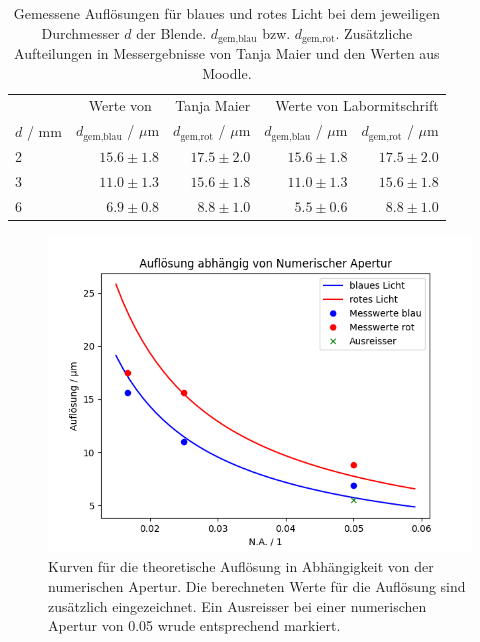 \documentclass{article}
\begin{document}
\begin{table}[H]
\caption{Gemessene Auflösungen für blaues und rotes Licht bei dem jeweiligen Durchmesser $d$ der Blende. $d_{\text{gem,blau}}$ bzw. $d_{\text{gem,rot}}$. Zusätzliche Aufteilungen in Messergebnisse von Tanja Maier und den Werten aus Moodle.}
\label{tab:gem_aufl}

\begin{tabular}{l|rr|rr}
& \multicolumn{2}{p{2.5cm}|}{Werte von  ~~ Tanja Maier} & \multicolumn{2}{p{2.5cm}}{Werte von Labor\-mitschrift} \\
$d$ / mm  & $d_{\text{gem,blau}}$ / $\mu$m & $d_{\text{gem,rot}}$ / $\mu$m & $d_{\text{gem,blau}}$ / $\mu$m & $d_{\text{gem,rot}}$ / $\mu$m   \\
\hline
2 &  $15.6\pm1.8$ & $17.5\pm2.0$ & $15.6\pm1.8$ & $17.5\pm2.0$ \\
3 &  $11.0\pm1.3$ & $15.6\pm1.8$ & $11.0\pm1.3$ & $15.6\pm1.8$ \\
6 &  $6.9\pm0.8$ & $8.8\pm1.0$ & $5.5\pm0.6$ & $8.8\pm1.0$
\end{tabular}
\end{table}







\begin{figure}[H]
\caption{Kurven für die theoretische Auflösung in Abhängigkeit von der numerischen Apertur. Die berechneten Werte für die Auflösung sind zusätzlich eingezeichnet. Ein Ausreisser bei einer numerischen Apertur von 0.05 wrude entsprechend markiert.}
\label{fig:kurven}
\includegraphics[scale=0.7]{plot.png}

\end{figure}
\end{document}
